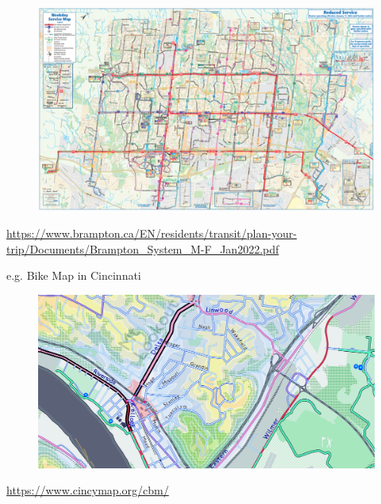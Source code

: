 \documentclass[aspectratio=169]{beamer}
\begin{document}
\begin{frame}
	
	\begin{figure}
		\centering
		\includegraphics[width=0.93\linewidth]{images/brampton_map.png}
	\end{figure}
	
	\tiny \url{https://www.brampton.ca/EN/residents/transit/plan-your-trip/Documents/Brampton_System_M-F_Jan2022.pdf}
	
\end{frame}








\begin{frame}
	
	e.g. Bike Map in Cincinnati
	
	\begin{figure}
		\centering
		\includegraphics[width=1\linewidth]{images/bike_map_1.png}
	\end{figure}
	
	\tiny \url{https://www.cincymap.org/cbm/}
	
\end{frame}
\end{document}

